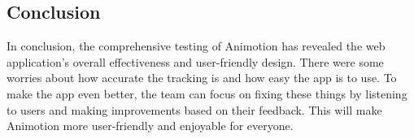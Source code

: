 \subsection{Conclusion}
In conclusion, the comprehensive testing of Animotion has revealed the web application's overall effectiveness and user-friendly design. 
There were some worries about how accurate the tracking is and how easy the app is to use. To make the app even better, 
the team can focus on fixing these things by listening to users and making improvements based on their feedback. 
This will make Animotion more user-friendly and enjoyable for everyone.
